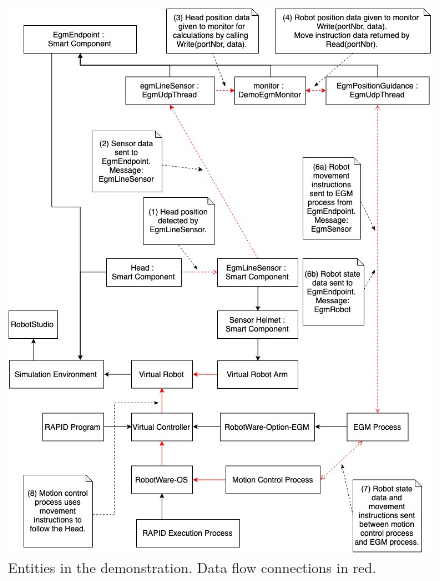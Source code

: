 \documentclass{cslthse-msc}
\begin{document}
\begin{figure}[H]
\vspace{2cm}
    \centering
    \includegraphics[width=14cm]{ArchComponents2.jpg}
    \caption{Entities in the demonstration. Data flow connections in red.}
    \label{fig:demo_arch}
\end{figure}
\end{document}
